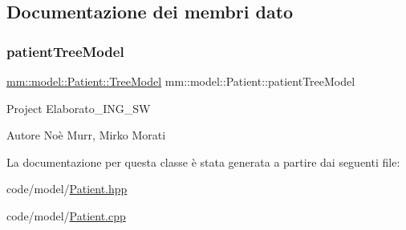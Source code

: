 \subsection{Documentazione dei membri dato}
\mbox{\label{classmm_1_1model_1_1_patient_af2fe625b7bf2e3308df51daaff966281}} 
\subsubsection{\texorpdfstring{patient\+Tree\+Model}{patientTreeModel}}
{\footnotesize\ttfamily \mbox{\hyperlink{structmm_1_1model_1_1_patient_1_1_tree_model}{mm\+::model\+::\+Patient\+::\+Tree\+Model}} mm\+::model\+::\+Patient\+::patient\+Tree\+Model\hspace{0.3cm}{\ttfamily [static]}}

Project Elaborato\+\_\+\+I\+N\+G\+\_\+\+SW \begin{DoxyAuthor}{Autore}
Noè Murr, Mirko Morati 
\end{DoxyAuthor}


La documentazione per questa classe è stata generata a partire dai seguenti file\+:\begin{DoxyCompactItemize}
\item 
code/model/\mbox{\hyperlink{_patient_8hpp}{Patient.\+hpp}}\item 
code/model/\mbox{\hyperlink{_patient_8cpp}{Patient.\+cpp}}\end{DoxyCompactItemize}
